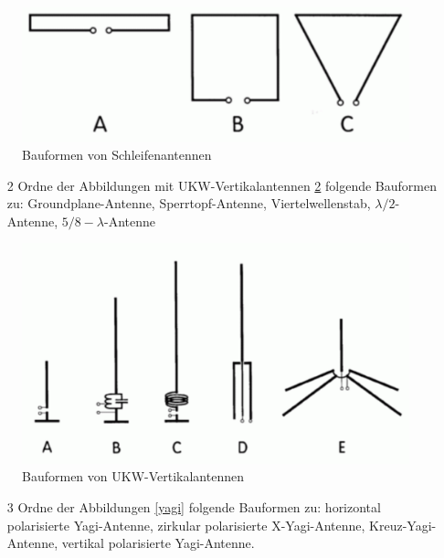 \begin{figure}[H]
	\centering
	\includegraphics[scale=0.4]{Antennen/Bilder/Schleifen.pdf}
	\caption{Bauformen von Schleifenantennen}
	\label{schleifen}
\end{figure}


\begin{enumerate} 
\itemsep1pt\parskip0pt
\item[2] Ordne der Abbildungen mit UKW-Vertikalantennen \ref{ukw} folgende Bauformen zu: Groundplane-Antenne, Sperrtopf-Antenne, Viertelwellenstab, $\lambda/2$-Antenne, $5/8- \lambda$-Antenne
\end{enumerate}

\begin{figure}[H]
	\centering
	\includegraphics[scale=0.4]{Antennen/Bilder/ukw.pdf}
	\caption{Bauformen von UKW-Vertikalantennen}
	\label{ukw}
\end{figure}



\begin{enumerate} 
\itemsep1pt\parskip0pt
\item[3] Ordne der Abbildungen \ref{yagi} folgende Bauformen zu: horizontal polarisierte Yagi-Antenne, zirkular polarisierte X-Yagi-Antenne, Kreuz-Yagi-Antenne, vertikal polarisierte Yagi-Antenne.
\end{enumerate}

